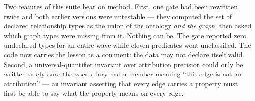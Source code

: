 Two features of this suite bear on method. First, one gate had been rewritten twice
and both earlier versions were untestable --- they computed the set of declared
relationship types as the union of the ontology \emph{and the graph}, then asked which
graph types were missing from it. Nothing can be. The gate reported zero undeclared
types for an entire wave while eleven predicates went unclassified. The code now
carries the lesson as a comment: the data may not declare itself valid. Second, a
universal-quantifier invariant over attribution precision could only be written safely
once the vocabulary had a member meaning ``this edge is not an attribution'' ---
an invariant asserting that every edge carries a property must first be able to say
what the property means on every edge.
